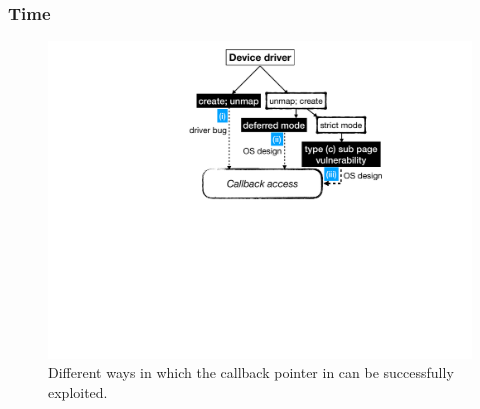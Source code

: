 \subsubsection{\DIFdelbegin {}\DIFdelend Time \DIFdelbegin {}\DIFdelend \DIFaddbegin {}\DIFaddend }\label{sec:shinfo}

\begin{figure}[t]
    \centering
    \includegraphics[width=0.75\linewidth]{figs/road_to_op.pdf}
    \caption{Different ways in which the callback pointer in \shinfo can be successfully exploited.}
    \label{fig:road_to_op}
\end{figure}



